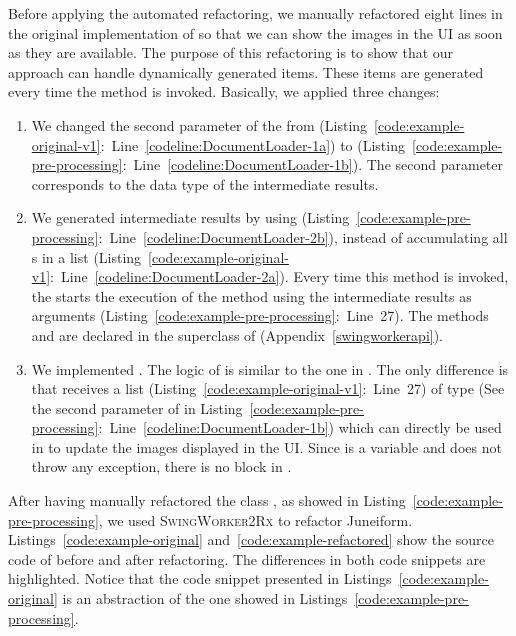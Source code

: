 \documentclass[type=bsc,accentcolor=tud9c]{tudthesis}
\newcommand{\toolextension}{\textsc{SwingWorker2Rx}}
\begin{document}
Before applying the automated refactoring, we manually refactored eight lines in the original implementation of  so that we can show the images in the UI as soon as they are available. The purpose of this refactoring is to show that our approach can handle dynamically generated items. These items are generated every time the method  is invoked. Basically, we applied three changes:
\begin{enumerate}
	\item We changed the second parameter of the  from  (Listing~\ref{code:example-original-v1}:~Line~\ref{codeline:DocumentLoader-1a}) to  (Listing~\ref{code:example-pre-processing}:~Line~\ref{codeline:DocumentLoader-1b}). The second parameter corresponds to the data type of the intermediate results. 
	\item We generated intermediate results by using  (Listing~\ref{code:example-pre-processing}:~Line~\ref{codeline:DocumentLoader-2b}), instead of accumulating all s in a list (Listing~\ref{code:example-original-v1}:~Line~\ref{codeline:DocumentLoader-2a}). Every time this method is invoked, the  starts the execution of the method  using the intermediate results as arguments (Listing~\ref{code:example-pre-processing}:~Line~27). The methods  and  are declared in the superclass of  (Appendix~\ref{swingworkerapi}).
	\item We implemented . The logic of  is similar to the one in . The only difference is that  receives a list  (Listing~\ref{code:example-original-v1}:~Line~27) of type  (See the second parameter of  in Listing~\ref{code:example-pre-processing}:~Line~\ref{codeline:DocumentLoader-1b}) which can directly be used in  to update the images displayed in the UI. Since  is a variable and  does not throw any exception, there is no  block in .
\end{enumerate}



After having manually refactored the class , as showed in Listing~\ref{code:example-pre-processing}, we used \toolextension{} to refactor Juneiform. Listings~\ref{code:example-original} and~\ref{code:example-refactored} show the source code of  before and after refactoring. The differences in both code snippets are highlighted. Notice that the code snippet presented in Listings~\ref{code:example-original} is an abstraction of the one showed in Listings~\ref{code:example-pre-processing}.
\end{document}
